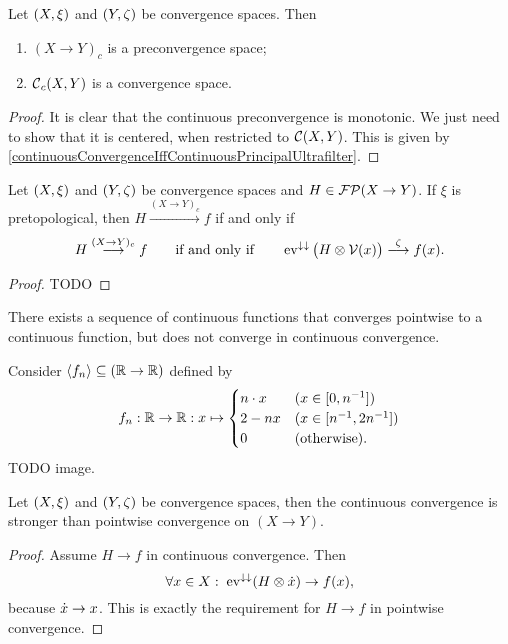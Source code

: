 \begin{lemma}
Let $\sSet{X,\xi}$ and $\sSet{Y,\zeta}$ be convergence spaces. Then
\begin{enumerate}
\item $(X\to Y)_c$ is a preconvergence space;
\item $\operatorname{\mathcal{C}}_c(X,Y)$ is a convergence space.
\end{enumerate}
\end{lemma}
\begin{proof}
It is clear that the continuous preconvergence is monotonic. We just need to show that it is centered, when restricted to $\operatorname{\mathcal{C}}(X,Y)$. This is given by \ref{continuousConvergenceIffContinuousPrincipalUltrafilter}.
\end{proof}


\begin{lemma}
Let $\sSet{X,\xi}$ and $\sSet{Y,\zeta}$ be convergence spaces and $H\in \operatorname{\mathcal{FP}}(X\to Y)$. If $\xi$ is pretopological, then $H\overset{(X\to Y)_c}{\longrightarrow} f$ \textup{if and only if}
\[ H\overset{(X\to Y)_c}{\longrightarrow} f\qquad \text{if and only if} \qquad \operatorname{ev}^{\downarrow\downarrow}\big(H\otimes \operatorname{\mathcal{V}}(x)\big) \overset{\zeta}{\longrightarrow} f(x). \]
\end{lemma}
\begin{proof}
TODO
\end{proof}

\begin{example}
There exists a sequence of continuous functions that converges pointwise to a continuous function, but does not converge in continuous convergence.

Consider $\left\langle f_n \right\rangle \subseteq (\mathbb{R}\to\mathbb{R})$ defined by
\[ f_n: \R\to\R: x\mapsto \begin{cases}
n\cdot x & (x\in \interval{0,n^{-1}}) \\
2 - nx & (x\in \interval{n^{-1}, 2n^{-1}}) \\
0 & (\text{otherwise}).
\end{cases} \]
TODO image.
\end{example}

\begin{lemma} \label{strengthContinuousPointwiseConvergence}
Let $\sSet{X,\xi}$ and $\sSet{Y,\zeta}$ be convergence spaces, then the continuous convergence is stronger than pointwise convergence on $(X\to Y)$.
\end{lemma}
\begin{proof}
Assume $H\to f$ in continuous convergence. Then
\[ \forall x\in X: \; \operatorname{ev}^{\downarrow\downarrow}(H\otimes \dot{x}) \to f(x), \]
because $\dot{x}\to x$. This is exactly the requirement for $H\to f$ in pointwise convergence.
\end{proof}



